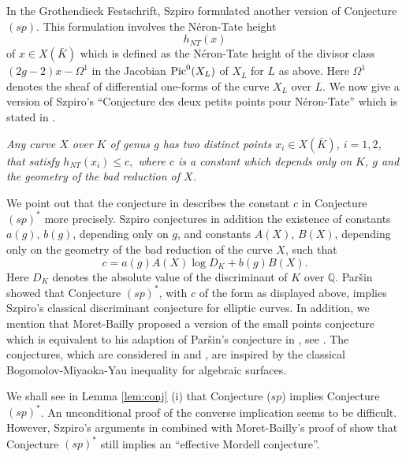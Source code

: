 \documentclass[11pt]{article}
\numberwithin{equation}{section}
\newcommand {\QQ}  {{\mathbb Q}}
\newcommand {\cc} {sp}
\newcommand {\bb} {(sp)^*}
\newcommand {\p} {x}
\begin{document}
In the Grothendieck Festschrift, Szpiro \cite{szpiro:grothendieck} formulated   another version of Conjecture $(\cc)$. This formulation involves the N\'eron-Tate height
\begin{equation}\label{def:nt}
h_{NT}(\p)
\end{equation} 
of $\p\in X(\bar{K})$ which is defined as the N\'eron-Tate height of the divisor class $(2g-2)\p-\Omega^1$ in the Jacobian $\textnormal{Pic}^0(X_L)$ of $X_L$ for $L$ as above.
Here $\Omega^1$ denotes the sheaf of differential one-forms of the curve $X_L$ over $L$. We now give a version of Szpiro's ``Conjecture des deux petits points pour N\'eron-Tate'' which is stated in \cite[p.244]{szpiro:grothendieck}. 

\vspace{0.3cm}
\noindent{\bf Conjecture $\bb$.}
\emph{Any curve $X$ over $K$ of genus $g$ has two distinct points $\p_i\in X(\bar{K})$, $i=1,2$, that satisfy $h_{NT}(\p_i)\leq c,$ where $c$ is a constant which depends only on $K$, $g$ and the geometry of the bad reduction of $X$.\vspace{0.3cm}}

We point out that the conjecture in \cite[p.244]{szpiro:grothendieck} describes the constant $c$ in Conjecture $\bb$ more precisely. Szpiro conjectures in addition the existence of constants $a(g)$, $b(g)$, depending only on $g$, and constants $A(X)$, $B(X)$, depending only on the geometry of the bad reduction of the curve $X$, such that
\begin{equation*}
c=a(g)A(X)\log D_K+b(g)B(X).
\end{equation*}
Here $D_K$ denotes the absolute value of the discriminant of $K$ over $\QQ$. Par{\v{s}}in \cite{parshin:szpiro} showed that Conjecture $\bb$, with $c$ of the form as displayed above, implies Szpiro's classical discriminant conjecture for elliptic curves. In addition, we mention that Moret-Bailly proposed a  version of the small points conjecture which is equivalent to his adaption \cite[Hypoth\`ese BM]{moret-bailly:effmordell} of Par{\v{s}}in's conjecture in \cite{parshin:szpiro}, see \cite[Corollaire 3.5]{moret-bailly:effmordell}. The conjectures, which are considered in  \cite{parshin:szpiro} and \cite{moret-bailly:effmordell}, are inspired by the classical Bogomolov-Miyaoka-Yau inequality for algebraic surfaces.


We shall see in Lemma \ref{lem:conj} (i) that Conjecture ($\cc$) implies Conjecture $\bb$. An unconditional proof of the converse implication seems to be difficult.
However,  Szpiro's arguments in \cite[p.244]{szpiro:grothendieck} combined with Moret-Bailly's proof of \cite[Th\'eor\`eme 5.1]{moret-bailly:effmordell} show that Conjecture $\bb$ still implies an ``effective Mordell conjecture''.
\end{document}
